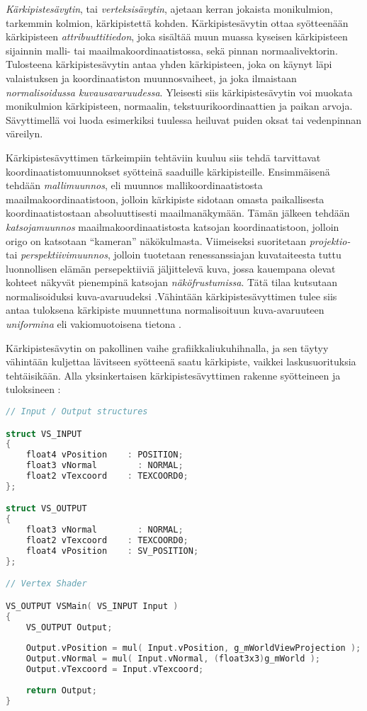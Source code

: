 \documentclass[finnish]{tktltiki2}
\theoremstyle{definition}
\theoremstyle{remark}
\begin{document}
\emph{Kärkipistesävytin}, tai \emph{verteksisävytin}, ajetaan kerran jokaista monikulmion, tarkemmin kolmion, kärkipistettä kohden. Kärkipistesävytin ottaa syötteenään kärkipisteen \emph{attribuuttitiedon}, joka sisältää muun muassa kyseisen kärkipisteen sijainnin malli- tai maailmakoordinaatistossa, sekä pinnan normaalivektorin. Tulosteena kärkipistesävytin antaa yhden kärkipisteen, joka on käynyt läpi valaistuksen ja koordinaatiston muunnosvaiheet, ja joka ilmaistaan \emph{normalisoidussa kuvausavaruudessa}. Yleisesti siis kärkipistesävytin voi muokata monikulmion kärkipisteen, normaalin, tekstuurikoordinaattien ja paikan arvoja. Sävyttimellä voi luoda esimerkiksi tuulessa heiluvat puiden oksat tai vedenpinnan väreilyn.

Kärkipistesävyttimen tärkeimpiin tehtäviin kuuluu siis tehdä tarvittavat koordinaatistomuunnokset syötteinä saaduille kärkipisteille. Ensimmäisenä tehdään \emph{mallimuunnos}, eli muunnos mallikoordinaatistosta maailmakoordinaatistoon, jolloin kärkipiste sidotaan omasta paikallisesta koordinaatistostaan absoluuttisesti maailmanäkymään. Tämän jälkeen tehdään \emph{katsojamuunnos} maailmakoordinaatistosta katsojan koordinaatistoon, jolloin origo on katsotaan ``kameran'' näkökulmasta. Viimeiseksi suoritetaan \emph{projektio-} tai \emph{perspektiivimuunnos}, jolloin tuotetaan renessanssiajan kuvataiteesta tuttu luonnollisen elämän persepektiiviä jäljittelevä kuva, jossa kauempana olevat kohteet näkyvät pienempinä katsojan \emph{näköfrustumissa}. Tätä tilaa kutsutaan normalisoiduksi kuva-avaruudeksi \cite{Puh08}.Vähintään kärkipistesävyttimen tulee siis antaa tuloksena kärkipiste muunnettuna normalisoituun kuva-avaruuteen \emph{uniformina} eli vakiomuotoisena tietona \cite{Puh08}.

Kärkipistesävytin on pakollinen vaihe grafiikkaliukuhihnalla, ja sen täytyy vähintään kuljettaa lävitseen syötteenä saatu kärkipiste, vaikkei laskusuorituksia tehtäisikään. Alla yksinkertaisen kärkipistesävyttimen rakenne syötteineen ja tuloksineen \cite{Mic11}:
\lstset{breaklines=true}
\begin{lstlisting}[language=c, basicstyle=\footnotesize]
// Input / Output structures

struct VS_INPUT
{
    float4 vPosition    : POSITION;
    float3 vNormal        : NORMAL;
    float2 vTexcoord    : TEXCOORD0;
};

struct VS_OUTPUT
{
    float3 vNormal        : NORMAL;
    float2 vTexcoord    : TEXCOORD0;
    float4 vPosition    : SV_POSITION;
};

// Vertex Shader

VS_OUTPUT VSMain( VS_INPUT Input )
{
    VS_OUTPUT Output;
    
    Output.vPosition = mul( Input.vPosition, g_mWorldViewProjection );
    Output.vNormal = mul( Input.vNormal, (float3x3)g_mWorld );
    Output.vTexcoord = Input.vTexcoord;
    
    return Output;
}
\end{lstlisting}
\end{document}
